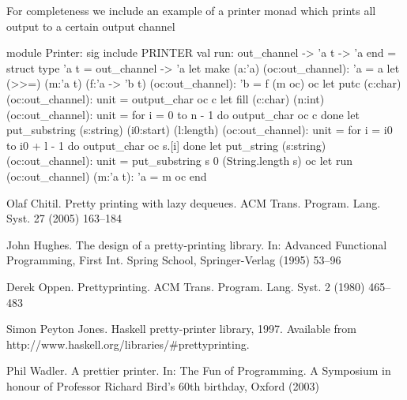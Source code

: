 \documentclass[12pt]{article}
\begin{document}
For completeness we include an example of a printer monad which prints all
output to a certain output channel
\begin{ocaml}
  module Printer:
  sig
    include PRINTER
    val run: out_channel -> 'a t -> 'a
  end =
    struct
      type 'a t = out_channel -> 'a
      let make (a:'a) (oc:out_channel): 'a = a
      let (>>=) (m:'a t) (f:'a -> 'b t) (oc:out_channel): 'b =
        f (m oc) oc
      let putc (c:char) (oc:out_channel): unit =
        output_char oc c
      let fill (c:char) (n:int) (oc:out_channel): unit =
        for i = 0 to n - 1 do
          output_char oc c
        done
      let put_substring (s:string) (i0:start) (l:length) (oc:out_channel): unit =
        for i = i0 to i0 + l - 1 do
          output_char oc s.[i]
        done
      let put_string (s:string) (oc:out_channel): unit =
        put_substring s 0 (String.length s) oc
      let run (oc:out_channel) (m:'a t): 'a =
        m oc
    end
\end{ocaml}




\begin{thebibliography}{99}

 Olaf Chitil. Pretty printing with lazy dequeues. ACM
  Trans. Program. Lang. Syst.  27 (2005) 163–184

 John Hughes. The design of a pretty-printing library. In:
  Advanced Functional Programming, First Int. Spring School, Springer-Verlag
  (1995) 53–96

 Derek Oppen. Prettyprinting. ACM
  Trans. Program. Lang. Syst. 2 (1980) 465–483

 Simon Peyton Jones. Haskell pretty-printer library,
  1997. Available from http://www.haskell.org/libraries/\#prettyprinting.

 Phil Wadler. A prettier printer. In: The Fun of
  Programming. A Symposium in honour of Professor Richard Bird’s 60th
  birthday, Oxford (2003)

\end{thebibliography}
\end{document}
